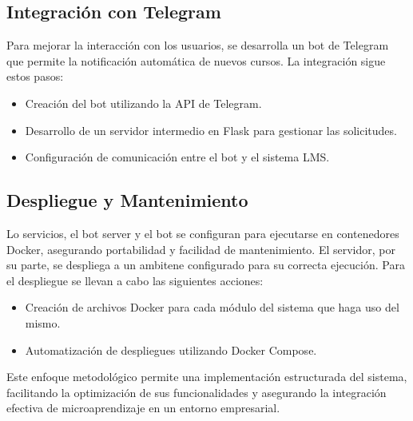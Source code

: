 \subsection{Integración con Telegram}  
Para mejorar la interacción con los usuarios, se desarrolla un bot de Telegram
que permite la notificación automática de nuevos cursos. La integración sigue
estos pasos:  

\begin{itemize}  
    \item Creación del bot utilizando la API de Telegram.  
    \item Desarrollo de un servidor intermedio en Flask para gestionar las
    solicitudes.  
    \item Configuración de comunicación entre el bot y el sistema LMS.  
\end{itemize}  

\subsection{Despliegue y Mantenimiento}  
Lo servicios, el bot server y el bot se configuran para ejecutarse en
contenedores Docker, asegurando portabilidad y facilidad de mantenimiento.
El servidor, por su parte, se despliega a un ambitene configurado para su
correcta ejecución.
Para el despliegue se llevan a cabo las siguientes acciones:  

\begin{itemize}  
    \item Creación de archivos Docker para cada módulo del sistema que haga uso del mismo.  
    \item Automatización de despliegues utilizando Docker Compose.  
\end{itemize}  

Este enfoque metodológico permite una implementación estructurada del sistema,
facilitando la optimización de sus funcionalidades y asegurando la integración
efectiva de microaprendizaje en un entorno empresarial.  
